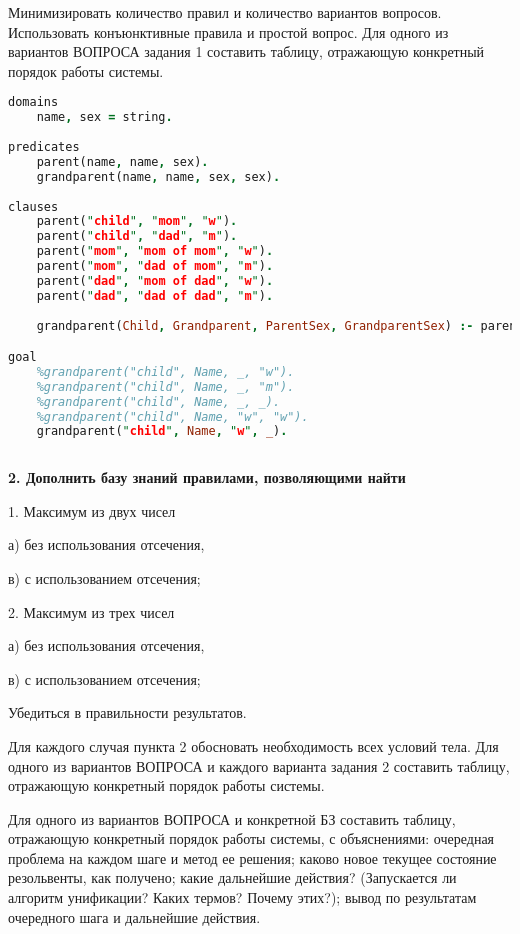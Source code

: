 \documentclass[12pt]{report}
\begin{document}
Минимизировать количество правил и количество вариантов вопросов. Использовать конъюнктивные правила и простой вопрос. Для одного из вариантов ВОПРОСА задания 1 составить таблицу, отражающую конкретный порядок работы системы.

\begin{lstlisting}[language=Prolog]
domains 	
	name, sex = string.  
	
predicates 	
	parent(name, name, sex).         
	grandparent(name, name, sex, sex). 
	
clauses 
	parent("child", "mom", "w").
	parent("child", "dad", "m").
	parent("mom", "mom of mom", "w").
	parent("mom", "dad of mom", "m").
	parent("dad", "mom of dad", "w").
	parent("dad", "dad of dad", "m").
	
	grandparent(Child, Grandparent, ParentSex, GrandparentSex) :- parent(Child, Parent, ParentSex), parent(Parent, Grandparent, GrandparentSex).

goal 	
	%grandparent("child", Name, _, "w"). 
	%grandparent("child", Name, _, "m"). 
	%grandparent("child", Name, _, _). 
	%grandparent("child", Name, "w", "w"). 
	grandparent("child", Name, "w", _).  
 
\end{lstlisting}

\textbf{2. Дополнить базу знаний правилами, позволяющими найти}

1. Максимум из двух чисел

а) без использования отсечения,

в) с использованием отсечения;

2. Максимум из трех чисел

а) без использования отсечения,

в) с использованием отсечения;

Убедиться в правильности результатов.

Для каждого случая пункта 2 обосновать необходимость всех условий тела.
Для одного из вариантов ВОПРОСА и каждого варианта задания 2 составить
таблицу, отражающую конкретный порядок работы системы.

Для одного из вариантов ВОПРОСА и конкретной БЗ составить таблицу, отражающую конкретный порядок работы системы, с объяснениями: очередная проблема на каждом шаге и метод ее решения; каково новое текущее состояние резольвенты, как получено; какие дальнейшие действия? (Запускается ли алгоритм унификации? Каких термов? Почему этих?); вывод по результатам очередного шага и дальнейшие действия.
\end{document}
